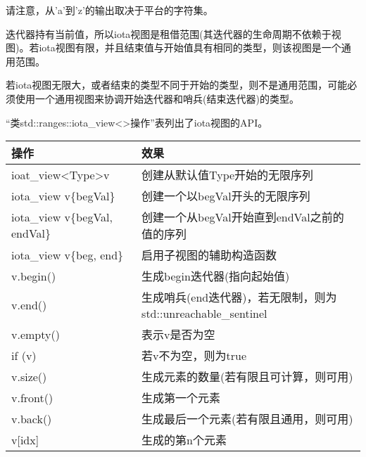 请注意，从'a'到'z'的输出取决于平台的字符集。


迭代器持有当前值，所以iota视图是租借范围(其迭代器的生命周期不依赖于视图)。若iota视图有限，并且结束值与开始值具有相同的类型，则该视图是一个通用范围。

若iota视图无限大，或者结束的类型不同于开始的类型，则不是通用范围，可能必须使用一个通用视图来协调开始迭代器和哨兵(结束迭代器)的类型。


“类std::ranges::iota\_view<>操作”表列出了iota视图的API。


\begin{longtable}[c]{|l|l|}
\hline
\textbf{操作}       & \textbf{效果}                                                    \\ \hline
\endfirsthead
%
\endhead
%
ioat\_view\textless{}Type\textgreater v & 创建从默认值Type开始的无限序列               \\ \hline
iota\_view v\{begVal\}   & 创建一个以begVal开头的无限序列                 \\ \hline
iota\_view v\{begVal, endVal\}          & 创建一个从begVal开始直到endVal之前的值的序列               \\ \hline
iota\_view v\{beg, end\} & 启用子视图的辅助构造函数                             \\ \hline
v.begin()                & 生成begin迭代器(指向起始值)         \\ \hline
v.end()                  & 生成哨兵(end迭代器)，若无限制，则为std::unreachable\_sentinel \\ \hline
v.empty()                & 表示v是否为空                                          \\ \hline
if (v)                   & 若v不为空，则为true                                             \\ \hline
v.size()                 & 生成元素的数量(若有限且可计算，则可用) \\ \hline
v.front()                & 生成第一个元素                                           \\ \hline
v.back()                 & 生成最后一个元素(若有限且通用，则可用)           \\ \hline
v{[}idx{]}               & 生成的第n个元素                                            \\ \hline
\end{longtable}

